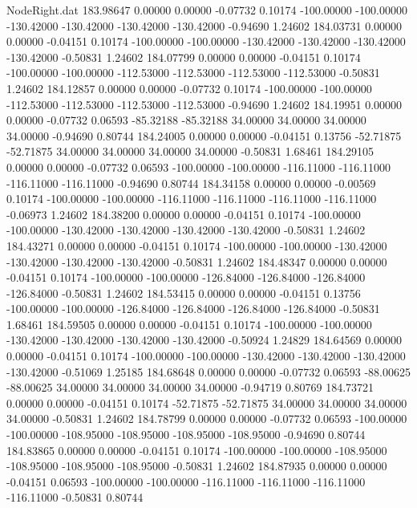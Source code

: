 \begin{filecontents}{NodeRight.dat}
 183.98647    0.00000    0.00000    -0.07732    0.10174 -100.00000 -100.00000 -130.42000 -130.42000 -130.42000 -130.42000   -0.94690    1.24602
 184.03731    0.00000    0.00000    -0.04151    0.10174 -100.00000 -100.00000 -130.42000 -130.42000 -130.42000 -130.42000   -0.50831    1.24602
 184.07799    0.00000    0.00000    -0.04151    0.10174 -100.00000 -100.00000 -112.53000 -112.53000 -112.53000 -112.53000   -0.50831    1.24602
 184.12857    0.00000    0.00000    -0.07732    0.10174 -100.00000 -100.00000 -112.53000 -112.53000 -112.53000 -112.53000   -0.94690    1.24602
 184.19951    0.00000    0.00000    -0.07732    0.06593  -85.32188  -85.32188   34.00000   34.00000   34.00000   34.00000   -0.94690    0.80744
 184.24005    0.00000    0.00000    -0.04151    0.13756  -52.71875  -52.71875   34.00000   34.00000   34.00000   34.00000   -0.50831    1.68461
 184.29105    0.00000    0.00000    -0.07732    0.06593 -100.00000 -100.00000 -116.11000 -116.11000 -116.11000 -116.11000   -0.94690    0.80744
 184.34158    0.00000    0.00000    -0.00569    0.10174 -100.00000 -100.00000 -116.11000 -116.11000 -116.11000 -116.11000   -0.06973    1.24602
 184.38200    0.00000    0.00000    -0.04151    0.10174 -100.00000 -100.00000 -130.42000 -130.42000 -130.42000 -130.42000   -0.50831    1.24602
 184.43271    0.00000    0.00000    -0.04151    0.10174 -100.00000 -100.00000 -130.42000 -130.42000 -130.42000 -130.42000   -0.50831    1.24602
 184.48347    0.00000    0.00000    -0.04151    0.10174 -100.00000 -100.00000 -126.84000 -126.84000 -126.84000 -126.84000   -0.50831    1.24602
 184.53415    0.00000    0.00000    -0.04151    0.13756 -100.00000 -100.00000 -126.84000 -126.84000 -126.84000 -126.84000   -0.50831    1.68461
 184.59505    0.00000    0.00000    -0.04151    0.10174 -100.00000 -100.00000 -130.42000 -130.42000 -130.42000 -130.42000   -0.50924    1.24829
 184.64569    0.00000    0.00000    -0.04151    0.10174 -100.00000 -100.00000 -130.42000 -130.42000 -130.42000 -130.42000   -0.51069    1.25185
 184.68648    0.00000    0.00000    -0.07732    0.06593  -88.00625  -88.00625   34.00000   34.00000   34.00000   34.00000   -0.94719    0.80769
 184.73721    0.00000    0.00000    -0.04151    0.10174  -52.71875  -52.71875   34.00000   34.00000   34.00000   34.00000   -0.50831    1.24602
 184.78799    0.00000    0.00000    -0.07732    0.06593 -100.00000 -100.00000 -108.95000 -108.95000 -108.95000 -108.95000   -0.94690    0.80744
 184.83865    0.00000    0.00000    -0.04151    0.10174 -100.00000 -100.00000 -108.95000 -108.95000 -108.95000 -108.95000   -0.50831    1.24602
 184.87935    0.00000    0.00000    -0.04151    0.06593 -100.00000 -100.00000 -116.11000 -116.11000 -116.11000 -116.11000   -0.50831    0.80744

\end{filecontents}
